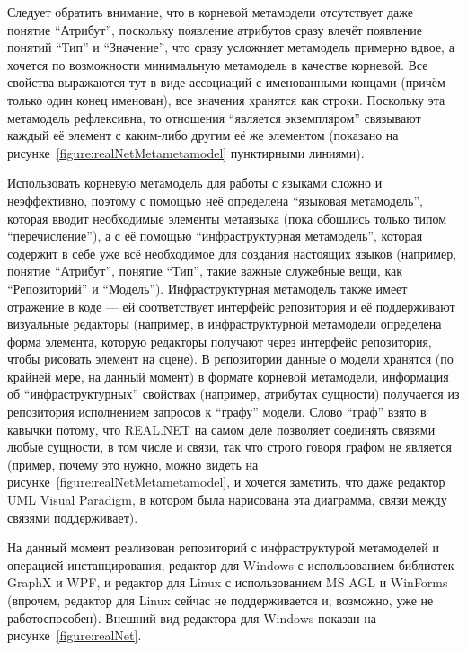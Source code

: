 \documentclass[a5paper]{article}
\begin{document}
Следует обратить внимание, что в корневой метамодели отсутствует даже понятие ``Атрибут'', поскольку появление атрибутов сразу влечёт появление понятий ``Тип'' и ``Значение'', что сразу усложняет метамодель примерно вдвое, а хочется по возможности минимальную метамодель в качестве корневой. Все свойства выражаются тут в виде ассоциаций с именованными концами (причём только один конец именован), все значения хранятся как строки. Поскольку эта метамодель рефлексивна, то отношения ``является экземпляром'' связывают каждый её элемент с каким-либо другим её же элементом (показано на рисунке~\ref{figure:realNetMetametamodel} пунктирными линиями).

Использовать корневую метамодель для работы с языками сложно и неэффективно, поэтому с помощью неё определена ``языковая метамодель'', которая вводит необходимые элементы метаязыка (пока обошлись только типом ``перечисление''), а с её помощью ``инфраструктурная метамодель'', которая содержит в себе уже всё необходимое для создания настоящих языков (например, понятие ``Атрибут'', понятие ``Тип'', такие важные служебные вещи, как ``Репозиторий'' и ``Модель''). Инфраструктурная метамодель также имеет отражение в коде --- ей соответствует интерфейс репозитория и её поддерживают визуальные редакторы (например, в инфраструктурной метамодели определена форма элемента, которую редакторы получают через интерфейс репозитория, чтобы рисовать элемент на сцене). В репозитории данные о модели хранятся (по крайней мере, на данный момент) в формате корневой метамодели, информация об ``инфраструктурных'' свойствах (например, атрибутах сущности) получается из репозитория исполнением запросов к ``графу'' модели. Слово ``граф'' взято в кавычки потому, что REAL.NET на самом деле позволяет соединять связями любые сущности, в том числе и связи, так что строго говоря графом не является (пример, почему это нужно, можно видеть на рисунке~\ref{figure:realNetMetametamodel}, и хочется заметить, что даже редактор UML Visual Paradigm, в котором была нарисована эта диаграмма, связи между связями поддерживает).

На данный момент реализован репозиторий с инфраструктурой метамоделей и операцией инстанцирования, редактор для Windows с использованием библиотек GraphX и WPF, и редактор для Linux с использованием MS AGL и WinForms (впрочем, редактор для Linux сейчас не поддерживается и, возможно, уже не работоспособен). Внешний вид редактора для Windows показан на рисунке~\ref{figure:realNet}.
\end{document}

